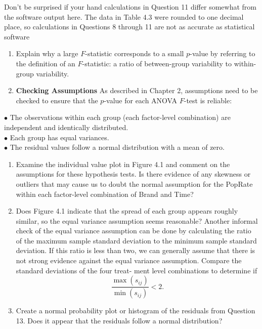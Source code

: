 \documentclass[
]{report}
\providecommand{\tightlist}{%
  \setlength{\itemsep}{0pt}\setlength{\parskip}{0pt}}
\begin{document}
Don't be surprised if your hand calculations in Question 11 differ somewhat from the software
output here. The data in Table 4.3 were rounded to one decimal place, so calculations in Questions 8
through 11 are not as accurate as statistical software

\begin{enumerate}
\def\labelenumi{\arabic{enumi}.}
\setcounter{enumi}{13}
\tightlist
\item
  Explain why a large \(F\)-statistic corresponds to a small \(p\)-value by referring to the definition of an \(F\)-statistic: a ratio of between-group variability to within-group variability.\\
\item
  \textbf{Checking Assumptions} As described in Chapter 2, assumptions need to be checked to ensure that the \(p\)-value for each ANOVA \(F\)-test is reliable:
\end{enumerate}

\(\bullet\) The observations within each group (each factor-level combination) are independent and identically distributed.\\
\(\bullet\) Each group has equal variances.\\
\(\bullet\) The residual values follow a normal distribution with a mean of zero.

\begin{enumerate}
\def\labelenumi{\alph{enumi}.}
\item
  Examine the individual value plot in Figure 4.1 and comment on the assumptions for these hypothesis tests. Is there evidence of any skewness or outliers that may cause us to doubt the normal
  assumption for the PopRate within each factor-level combination of Brand and Time?
\item
  Does Figure 4.1 indicate that the spread of each group appears roughly similar, so the equal variance
  assumption seems reasonable? Another informal check of the equal variance assumption can
  be done by calculating the ratio of the maximum sample standard deviation to the minimum sample
  standard deviation. If this ratio is less than two, we can generally assume that there is not strong
  evidence against the equal variance assumption. Compare the standard deviations of the four treat-
  ment level combinations to determine if\\
  \[
   \frac{\max(s_{ij})}{\min(s_{ij})} < 2.
   \]
\item
  Create a normal probability plot or histogram of the residuals from Question 13. Does it appear that
  the residuals follow a normal distribution?
\end{enumerate}
\end{document}
